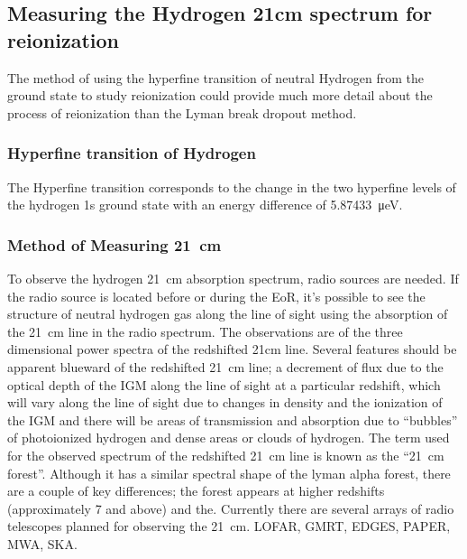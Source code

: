 
    \subsection{Measuring the Hydrogen 21cm spectrum for reionization} %
    \label{sub:Hydrogen_21cm}
        The method of using the hyperfine transition of neutral Hydrogen from the ground state to study reionization could provide much more detail about the process of reionization than the Lyman break dropout method.

         \subsubsection{Hyperfine transition of Hydrogen} %
         \label{subsub:Hyperfine_Hydrogen}
            The Hyperfine transition corresponds to the change in the two hyperfine levels of the hydrogen 1s ground state with an energy difference of \SI{5.87433}{\micro\electronvolt}\cite{hyperphysics21}.

        \subsubsection{Method of Measuring \SI{21}{\centi\metre}} %
    	\label{subsub:Measuring_21cm}
            To observe the hydrogen \SI{21}{\centi\metre} absorption spectrum, radio sources are needed. If the radio source is located before or during the EoR, it's possible to see the structure of neutral hydrogen gas along the line of sight using the absorption of the \SI{21}{\centi\metre} line in the radio spectrum. The observations are of the three dimensional power spectra of the redshifted  21cm line\cite{liu2011method}. Several features should be apparent blueward of the redshifted \SI{21}{\centi\metre} line; a decrement of flux due to the optical depth of the IGM along the line of sight at a particular redshift, which will vary along the line of sight due to changes in density and the ionization of the IGM and there will be areas of transmission and absorption due to ``bubbles'' of photoionized hydrogen and dense areas or clouds of hydrogen. The term used for the observed spectrum of the redshifted \SI{21}{\centi\metre} line is known as the ``\SI{21}{\centi\metre} forest''. Although it has a similar spectral shape of the lyman alpha forest, there are a couple of key differences; the forest appears at higher redshifts (approximately 7 and above) and the. Currently there are several arrays of radio telescopes planned for observing the \SI{21}{\centi\metre}. LOFAR, GMRT, EDGES, PAPER, MWA, SKA\cite{mack2012detecting}.

